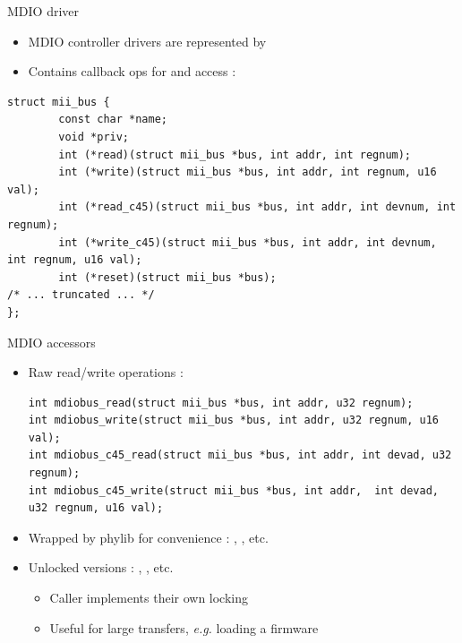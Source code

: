 \begin{frame}[fragile]{MDIO driver}
	\begin{itemize}
		\item MDIO controller drivers are represented by 
		\item Contains callback ops for  and  access :
	\end{itemize}
	\vspace{0.5cm}
	{\fontsize{9}{10}
	\begin{verbatim}
struct mii_bus {
        const char *name;
        void *priv;
        int (*read)(struct mii_bus *bus, int addr, int regnum);
        int (*write)(struct mii_bus *bus, int addr, int regnum, u16 val);
        int (*read_c45)(struct mii_bus *bus, int addr, int devnum, int regnum);
        int (*write_c45)(struct mii_bus *bus, int addr, int devnum, int regnum, u16 val);
        int (*reset)(struct mii_bus *bus);
/* ... truncated ... */
};
	\end{verbatim}
	}
\end{frame}

\begin{frame}[fragile]{MDIO accessors}
	\begin{itemize}
		\item Raw read/write operations :
			{\fontsize{9}{10}
			\begin{verbatim}
int mdiobus_read(struct mii_bus *bus, int addr, u32 regnum);
int mdiobus_write(struct mii_bus *bus, int addr, u32 regnum, u16 val);
int mdiobus_c45_read(struct mii_bus *bus, int addr, int devad, u32 regnum);
int mdiobus_c45_write(struct mii_bus *bus, int addr,  int devad, u32 regnum, u16 val);
			\end{verbatim}
			}
		\item Wrapped by phylib for convenience : , , etc.
		\item Unlocked versions : , , etc.
			\begin{itemize}
				\item Caller implements their own locking
				\item Useful for large transfers, \textit{e.g.} loading a firmware
			\end{itemize}
	\end{itemize}
\end{frame}

